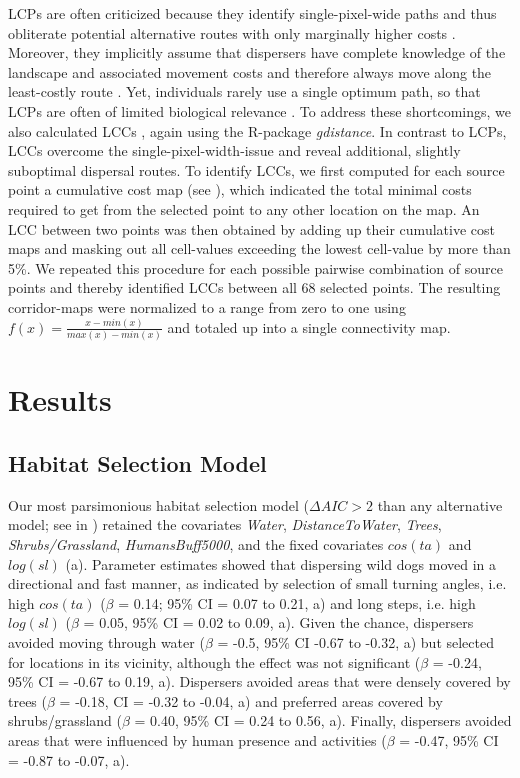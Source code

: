 \documentclass[abstract=on,10pt,a4paper,bibliography=totocnumbered]{scrartcl}
\begin{document}
LCPs are often criticized because they identify single-pixel-wide paths and thus
obliterate potential alternative routes with only marginally higher costs
\citep{Pinto.2009}. Moreover, they implicitly assume that dispersers have
complete knowledge of the landscape and associated movement costs and therefore
always move along the least-costly route \citep{Carroll.2012}. Yet, individuals
rarely use a single optimum path, so that LCPs are often of limited biological
relevance \citep{Pinto.2009, Pullinger.2010}. To address these shortcomings, we
also calculated LCCs \citep{Pinto.2009, Sawyer.2011}, again using the R-package
\textit{gdistance}. In contrast to LCPs, LCCs overcome the
single-pixel-width-issue and reveal additional, slightly suboptimal dispersal
routes. To identify LCCs, we first computed for each source point a cumulative
cost map (see ), which indicated the total minimal costs
required to get from the selected point to any other location on the map. An LCC
between two points was then obtained by adding up their cumulative cost maps and
masking out all cell-values exceeding the lowest cell-value by more than 5\%. We
repeated this procedure for each possible pairwise combination of source points
and thereby identified LCCs between all 68 selected points. The resulting
corridor-maps were normalized to a range from zero to one using \(f(x) = \frac{x
- min(x)}{max(x) - min(x)}\) and totaled up into a single connectivity map.

\newpage
\section{Results}
\subsection{Habitat Selection Model}
Our most parsimonious habitat selection model (\(\Delta AIC > 2\) than any
alternative model; see  in ) retained the covariates
\textit{Water}, \textit{DistanceToWater}, \textit{Trees},
\textit{Shrubs/Grassland}, \textit{HumansBuff5000}, and the fixed covariates
\(cos(ta)\) and \(log(sl)\) (a). Parameter estimates
showed that dispersing wild dogs moved in a directional and fast manner, as
indicated by selection of small turning angles, i.e. high \(cos(ta)\) (\(\beta\)
= 0.14; 95\% CI = 0.07 to 0.21, a) and long steps,
i.e. high \(log(sl)\) (\(\beta\) = 0.05, 95\% CI = 0.02 to 0.09,
a). Given the chance, dispersers avoided moving
through water (\(\beta\) = -0.5, 95\% CI -0.67 to -0.32,
a) but selected for locations in its vicinity,
although the effect was not significant (\(\beta\) = -0.24, 95\% CI = -0.67 to
0.19, a). Dispersers avoided areas that were densely
covered by trees (\(\beta\) = -0.18, CI = -0.32 to -0.04,
a) and preferred areas covered by shrubs/grassland
(\(\beta\) = 0.40, 95\% CI = 0.24 to 0.56, a).
Finally, dispersers avoided areas that were influenced by human presence and
activities (\(\beta\) = -0.47, 95\% CI = -0.87 to -0.07,
a).
\end{document}
